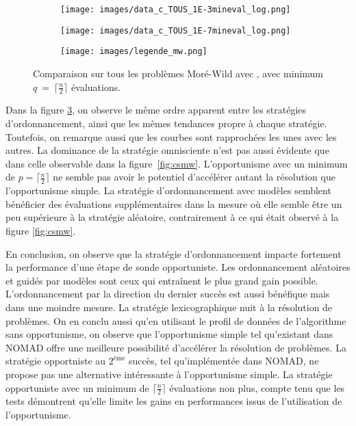 \begin{figure}[!htb]
	\centering
	\begin{subfigure}{0.43\textwidth}
		\texttt{[image: images/data\_c\_TOUS\_1E-3mineval\_log.png]}
		\label{fig:data_c_TOUS_1E-3mineval_log}
	\end{subfigure}%
	\begin{subfigure}{0.43\textwidth}
		\texttt{[image: images/data\_c\_TOUS\_1E-7mineval\_log.png]}
		\label{fig:data_c_TOUS_1E-7mineval_log}
	\end{subfigure}
	\smallskip
	\begin{subfigure}{0.95\textwidth}
		\texttt{[image: images/legende\_mw.png]}
	\end{subfigure}
	\caption{Comparaison sur tous les problèmes Moré-Wild avec \CS, avec minimum $q~=~\lceil\frac{n}{2}\rceil$ évaluations.} 
	\label{fig:cs_mw_p}
\end{figure} 
 
 
Dans la figure \ref{fig:cs_mw_p}, on observe le même ordre apparent entre les stratégies d'ordonnancement, ainsi que les mêmes tendances propre à chaque stratégie. Toutefois, on remarque aussi que les courbes sont rapprochées les unes avec les autres. La dominance de la stratégie omnisciente n'est pas aussi évidente que dans celle observable dans la figure~\ref{fig:csmw}. L'opportunisme avec un minimum de $p=\lceil\frac{n}{2}\rceil$ ne semble pas avoir le potentiel d'accélérer autant la résolution que l'opportunisme simple. La stratégie d'ordonnancement avec modèles semblent bénéficier des évaluations supplémentaires dans la mesure où elle semble être un peu supérieure à la stratégie aléatoire, contrairement à ce qui était observé à la figure \ref{fig:csmw}. 

En conclusion, on observe que la stratégie d'ordonnancement impacte fortement la performance d'une étape de sonde opportuniste. Les ordonnancement aléatoires et guidés par modèles sont ceux qui entraînent le plus grand gain possible. L'ordonnancement par la direction du dernier succès est aussi bénéfique mais dans une moindre mesure. La stratégie lexicographique nuit à la résolution de problèmes. On en conclu aussi qu'en utilisant le profil de données de l'algorithme sans opportunisme, on observe que l'opportunisme simple tel qu'existant dans NOMAD offre une meilleure possibilité d'accélérer la résolution de problèmes. La stratégie opportniste au $2^{\text{ème}}$ succès, tel qu'implémentée dans NOMAD, ne propose pas une alternative intéressante à l'opportunisme simple. La stratégie opportuniste avec un minimum de $\lceil\frac{n}{2}\rceil$ évaluations non plus, compte tenu que les tests démontrent qu'elle limite les gains en performances issus de l'utilisation de l'opportunisme.
